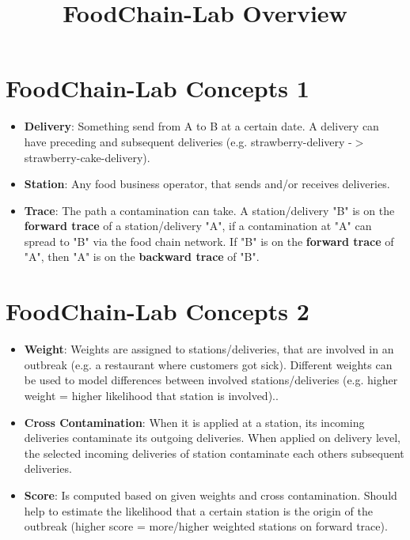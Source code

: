 \documentclass{beamer}
\title{FoodChain-Lab Overview}
\date{}
\begin{document}
\maketitle

\section{FoodChain-Lab Concepts 1}
\begin{frame}
	\begin{itemize}
		\item \textbf{Delivery}: Something send from A to B at a certain date. A delivery can have preceding and subsequent deliveries (e.g. strawberry-delivery -$>$ strawberry-cake-delivery).
		\item \textbf{Station}: Any food business operator, that sends and/or receives deliveries.
		\item \textbf{Trace}: The path a contamination can take. A station/delivery "B" is on the \textbf{forward trace} of a station/delivery "A", if a contamination at "A" can spread to "B" via the food chain network. If "B" is on the \textbf{forward trace} of "A", then "A" is on the \textbf{backward trace} of "B".
	\end{itemize}
\end{frame}

\section{FoodChain-Lab Concepts 2}
\begin{frame}
	\begin{itemize}
		\item \textbf{Weight}: Weights are assigned to stations/deliveries, that are involved in an outbreak (e.g. a restaurant where customers got sick). Different weights can be used to model differences between involved stations/deliveries (e.g. higher weight = higher likelihood that station is involved)..
		\item \textbf{Cross Contamination}: When it is applied at a station, its incoming deliveries contaminate its outgoing deliveries. When applied on delivery level, the selected incoming deliveries of station contaminate each others subsequent deliveries.
		\item \textbf{Score}: Is computed based on given weights and cross contamination. Should help to estimate the likelihood that a certain station is the origin of the outbreak (higher score = more/higher weighted stations on forward trace).
	\end{itemize}
\end{frame}
\end{document}
